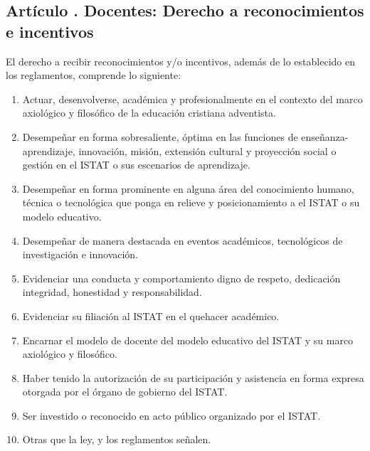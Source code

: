\subsection{Artículo . Docentes: Derecho a reconocimientos e incentivos}
\addtocounter{ns}{1}
El derecho a recibir reconocimientos y/o incentivos, además de lo establecido en los reglamentos, comprende lo siguiente: 
\begin{enumerate}
\item Actuar, desenvolverse, académica y profesionalmente en el contexto del marco axiológico y filosófico de la educación cristiana adventista. 
\item Desempeñar en forma sobresaliente, óptima en las funciones de enseñanza-aprendizaje, innovación, misión, extensión cultural y proyección social o gestión en el ISTAT o sus escenarios de aprendizaje. 
\item Desempeñar en forma prominente en alguna área del conocimiento humano, técnica o tecnológica que ponga en relieve y posicionamiento a el ISTAT o su modelo educativo. 
\item Desempeñar de manera destacada en eventos académicos, tecnológicos de investigación e innovación. 
\item Evidenciar una conducta y comportamiento digno de respeto, dedicación integridad, honestidad y responsabilidad. 
\item Evidenciar su filiación al ISTAT en el quehacer académico. 
\item Encarnar el modelo de docente del modelo educativo del ISTAT y su marco axiológico y filosófico. 
\item Haber tenido la autorización de su participación y asistencia en forma expresa otorgada por el órgano de gobierno del ISTAT. 
\item Ser investido o reconocido en acto público organizado por el ISTAT. 
\item Otras que la ley, y los reglamentos señalen.
\end{enumerate}
